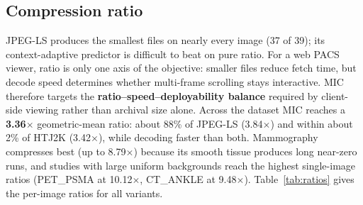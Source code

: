 \documentclass[journal]{IEEEtran}
\begin{document}
\subsection{Compression ratio}

JPEG-LS produces the smallest files on nearly every image (37 of 39); its
context-adaptive predictor is difficult to beat on pure ratio. For a web PACS
viewer, ratio is only one axis of the objective: smaller files reduce fetch
time, but decode speed determines whether multi-frame scrolling stays interactive.
MIC therefore targets the \textbf{ratio--speed--deployability balance} required
by client-side viewing rather than archival size alone. Across the dataset MIC
reaches a \textbf{3.36}$\times$ geometric-mean ratio: about 88\% of JPEG-LS
(3.84$\times$) and within about 2\% of HTJ2K (3.42$\times$), while decoding
faster than both. Mammography compresses best (up to 8.79$\times$) because its
smooth tissue produces long near-zero runs, and studies with large uniform
backgrounds reach the highest single-image ratios (PET\_PSMA at 10.12$\times$,
CT\_ANKLE at 9.48$\times$). Table~\ref{tab:ratios} gives the per-image ratios for
all variants.
\end{document}
